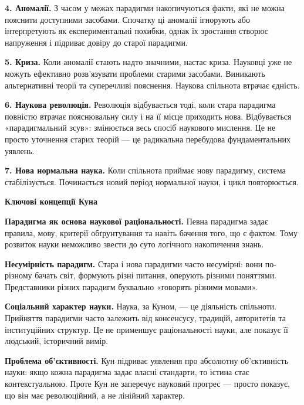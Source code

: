 \documentclass[12pt,a4paper]{article}
\begin{document}
\textbf{4. Аномалії.}  
З часом у межах парадигми накопичуються факти, які не можна пояснити доступними засобами. Спочатку ці аномалії ігнорують або інтерпретують як експериментальні похибки, однак їх зростання створює напруження і підриває довіру до старої парадигми.

\textbf{5. Криза.}  
Коли аномалії стають надто значними, настає криза. Науковці уже не можуть ефективно розв’язувати проблеми старими засобами. Виникають альтернативні теорії та суперечливі пояснення. Наукова спільнота втрачає єдність.

\textbf{6. Наукова революція.}  
Революція відбувається тоді, коли стара парадигма повністю втрачає пояснювальну силу і на її місце приходить нова. Відбувається «парадигмальний зсув»: змінюється весь спосіб наукового мислення. Це не просто уточнення старих теорій — це радикальна перебудова фундаментальних уявлень.

\textbf{7. Нова нормальна наука.}  
Коли спільнота приймає нову парадигму, система стабілізується. Починається новий період нормальної науки, і цикл повторюється.

\vspace{1em}

\begin{center}\textbf{\large Ключові концепції Куна}\end{center}

\textbf{Парадигма як основа наукової раціональності.}  
Певна парадигма задає правила, мову, критерії обґрунтування та навіть бачення того, що є фактом. Тому розвиток науки неможливо звести до суто логічного накопичення знань.

\textbf{Несумірність парадигм.}  
Стара і нова парадигми часто несумірні: вони по-різному бачать світ, формують різні питання, оперують різними поняттями. Представники різних парадигм буквально «говорять різними мовами».

\textbf{Соціальний характер науки.}  
Наука, за Куном, — це діяльність спільноти. Прийняття парадигми часто залежить від консенсусу, традицій, авторитетів та інституційних структур. Це не применшує раціональності науки, але показує її людський, історичний вимір.

\textbf{Проблема об’єктивності.}  
Кун підриває уявлення про абсолютну об’єктивність науки: якщо кожна парадигма задає власні стандарти, то істина стає контекстуальною. Проте Кун не заперечує науковий прогрес — просто показує, що він має революційний, а не лінійний характер.
\end{document}

